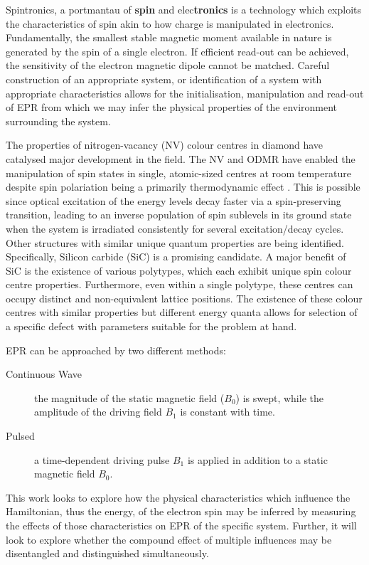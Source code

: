 Spintronics, a portmantau of \textbf{spin} and elec\textbf{tronics} is a technology which exploits the characteristics of spin akin to how charge is manipulated in electronics. Fundamentally, the smallest stable magnetic moment available in nature is generated by the spin of a single electron. If efficient read-out can be achieved, the sensitivity of the electron magnetic dipole cannot be matched. 
Careful construction of an appropriate system, or identification of a system with appropriate characteristics allows for the initialisation, manipulation and read-out of EPR from which we may infer the physical properties of the environment surrounding the system. 

The properties of nitrogen-vacancy (NV) colour centres in diamond have catalysed major development in the field.
The NV and ODMR have enabled the manipulation of spin states in single, atomic-sized centres at room temperature despite spin polariation being a primarily thermodynamic effect .
This is possible since optical excitation of the energy levels decay faster via a spin-preserving transition, leading to an inverse population of spin sublevels in its ground state when the system is irradiated consistently for several excitation/decay cycles.
Other structures with similar unique quantum properties are being identified. Specifically, Silicon carbide (SiC) is a promising candidate. A major benefit of SiC is the existence of various polytypes, which each exhibit unique spin colour centre properties. Furthermore, even within a single polytype, these centres can occupy distinct and non-equivalent lattice positions.
The existence of these colour centres with similar properties but different energy quanta allows for selection of a specific defect with parameters suitable for the problem at hand.

EPR can be approached by two different methods:
\begin{description}
	\item [Continuous Wave] the magnitude of the static magnetic field ($B_0$) is swept, while the
	      amplitude of the driving field $B_1$ is constant with time.
	\item [Pulsed] a time-dependent driving pulse $B_1$ is applied in
	      addition to a static magnetic field $B_0$.
\end{description}

This work looks to explore how the physical characteristics which influence the Hamiltonian, thus the energy, of the electron spin may be inferred by measuring the effects of those characteristics on EPR of the specific system. Further, it will look to explore whether the compound effect of multiple influences may be disentangled and distinguished simultaneously.




